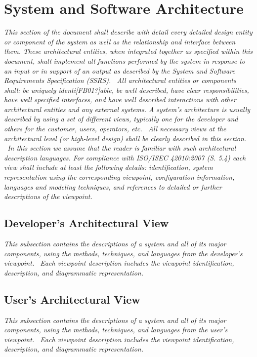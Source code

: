 \documentclass[twoside,letterpaper]{article}
\begin{document}
\section{System and Software Architecture}
{\itshape\color{black}
This section of the document shall describe with detail every detailed
design entity or component of the system as well as the relationship
and interface between them. These architectural entities, when
integrated together as specified within this document, shall implement
all functions performed by the system in response to an input or in
support of an output as described by the System and Software
Requirements Specification (SSRS). \ All architectural entities or
components shall: be uniquely identi[FB01?]able, be well described,
have clear responsibilities, have well specified interfaces, and have
well described interactions with other architectural entities and any
external systems. A system{\textquoteright}s architecture is usually
described by using a set of different views, typically one for the
developer and others for the customer, users, operators, etc. \ All
necessary views at the architectural level (or high-level design) shall
be clearly described in this section. \ In this section we assume that
the reader is familiar with such architectural description languages.
For compliance with ISO/ISEC 42010:2007 (S. 5.4) each view shall include
at least the following details: identification, system representation
using the corresponding viewpoint, configuration information, languages
and modeling techniques, and references to detailed or further
descriptions of the viewpoint. \ }

\subsection{Developer's Architectural View}
{\itshape\color{black}
This subsection contains the descriptions of a system and all of its
major components, using the methods, techniques, and languages from the
developer{\textquoteright}s viewpoint. \ Each viewpoint description
includes the viewpoint identification, description, and diagrammatic
representation. }

\subsection{User's Architectural View}
{\itshape\color{black}
This subsection contains the descriptions of a system and all of its
major components, using the methods, techniques, and languages from the
user{\textquoteright}s viewpoint. \ Each viewpoint description includes
the viewpoint identification, description, and diagrammatic
representation. }
\end{document}
